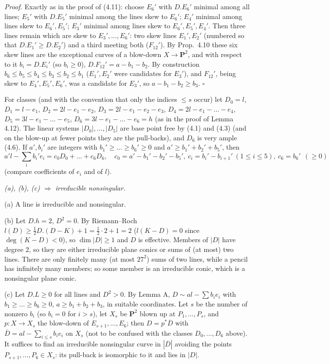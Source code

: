 \documentclass[11pt]{article}
\begin{document}
\emph{Proof.} Exactly as in the proof of (4.11): choose $E_6'$ with $D.E_6'$ minimal among all lines; $E_5'$ with $D.E_5'$ minimal among the lines skew to $E_6'$; $E_4'$ minimal among lines skew to $E_6',E_5'$; $E_3'$ minimal among lines skew to $E_6',E_5',E_4'$. Then three lines remain which are skew to $E_3',\dots,E_6'$: two skew lines $E_1',E_2'$ (numbered so that $D.E_1'\ge D.E_2'$) and a third meeting both ($F_{12}'$). By Prop.~4.10 these six skew lines are the exceptional curves of a blow-down $X\to\mathbf P^2$, and with respect to it $b_i=D.E_i'$ (so $b_i\ge0$), $D.F_{12}'=a-b_1-b_2$. By construction $b_6\le b_5\le b_4\le b_3\le b_2\le b_1$ ($E_1',E_2'$ were candidates for $E_3'$), and $F_{12}'$, being skew to $E_4',E_5',E_6'$, was a candidate for $E_3'$, so $a-b_1-b_2\ge b_3$. \hfill$\square$

For classes (and with the convention that only the indices $\le s$ occur) let $D_0=l$, $D_1=l-e_1$, $D_2=2l-e_1-e_2$, $D_3=2l-e_1-e_2-e_3$, $D_4=2l-e_1-\dots-e_4$, $D_5=3l-e_1-\dots-e_5$, $D_6=3l-e_1-\dots-e_6=h$ (as in the proof of Lemma 4.12). The linear systems $|D_0|,\dots,|D_5|$ are base point free by (4.1) and (4.3) (and on the blow-up at fewer points they are the pull-backs), and $D_6$ is very ample (4.6). If $a',b_i'$ are integers with $b_1'\ge\dots\ge b_6'\ge0$ and $a'\ge b_1'+b_2'+b_5'$, then
\[
a'l-\sum_i b_i'e_i=c_0D_0+\dots+c_6D_6,\quad c_0=a'-b_1'-b_2'-b_5',\ c_i=b_i'-b_{i+1}'\ (1\le i\le5),\ c_6=b_6'\ \ (\ge0)\tag{$*$}
\]
(compare coefficients of $e_i$ and of $l$).

\emph{(a), (b), (c) $\Rightarrow$ irreducible nonsingular.}

(a) A line is irreducible and nonsingular.

(b) Let $D.h=2$, $D^2=0$. By Riemann--Roch $l(D)\ge\frac12D.(D-K)+1=\frac12\cdot2+1=2$ ($l(K-D)=0$ since $\deg(K-D)<0$), so $\dim|D|\ge1$ and $D$ is effective. Members of $|D|$ have degree $2$, so they are either irreducible plane conics or sums of (at most) two lines. There are only finitely many (at most $27^2$) sums of two lines, while a pencil has infinitely many members; so some member is an irreducible conic, which is a nonsingular plane conic.

(c) Let $D.L\ge0$ for all lines and $D^2>0$. By Lemma A, $D\sim al-\sum b_ie_i$ with $b_1\ge\dots\ge b_6\ge0$, $a\ge b_1+b_2+b_3$, in suitable coordinates. Let $s$ be the number of nonzero $b_i$ (so $b_i=0$ for $i>s$), let $X_s$ be $\mathbf P^2$ blown up at $P_1,\dots,P_s$, and $p:X\to X_s$ the blow-down of $E_{s+1},\dots,E_6$; then $D=p^*\overline D$ with $\overline D=al-\sum_{i\le s}b_ie_i$ on $X_s$ (not to be confused with the classes $D_0,\dots,D_6$ above). It suffices to find an irreducible nonsingular curve in $|\overline D|$ avoiding the points $P_{s+1},\dots,P_6\in X_s$: its pull-back is isomorphic to it and lies in $|D|$.
\end{document}

